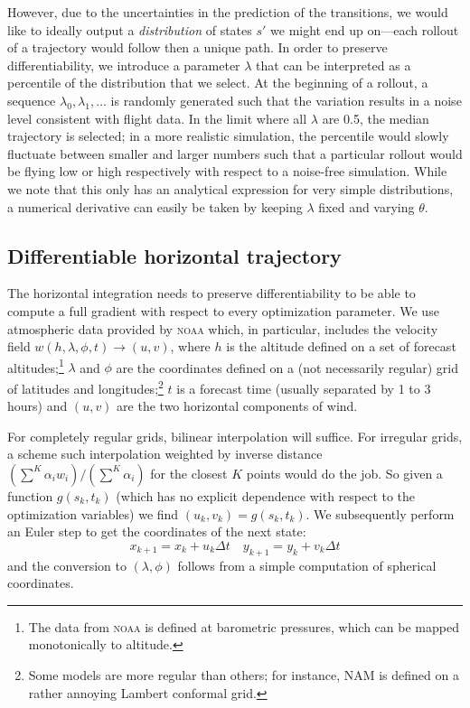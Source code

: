 \documentclass[11pt]{scrartcl} %
\begin{document}
However, due to the uncertainties in the prediction of the transitions, we would like to ideally output a \emph{distribution} of states $s'$ we might end up on---each rollout of a trajectory would follow then a unique path. In order to preserve differentiability, we introduce a parameter $\lambda$ that can be interpreted as a percentile of the distribution that we select. At the beginning of a rollout, a sequence $\lambda_0, \lambda_1, \dots$ is randomly generated such that the variation results in a noise level consistent with flight data. In the limit where all $\lambda$ are 0.5, the median trajectory is selected; in a more realistic simulation, the percentile would slowly fluctuate between smaller and larger numbers such that a particular rollout would be flying low or high respectively with respect to a noise-free simulation. While we note that this only has an analytical expression for very simple distributions, a numerical derivative can easily be taken by keeping $\lambda$ fixed and varying $\theta$.

\subsection{Differentiable horizontal trajectory} \label{sec:horizontal}
The horizontal integration needs to preserve differentiability to be able to compute a full gradient with respect to every optimization parameter. We use atmospheric data provided by \textsc{noaa} which, in particular, includes the velocity field $w(h, \lambda, \phi, t)\to(u, v)$, where $h$ is the altitude defined on a set of forecast altitudes;\footnote{The data from \textsc{noaa} is defined at barometric pressures, which can be mapped monotonically to altitude.} $\lambda$ and $\phi$ are the coordinates defined on a (not necessarily regular) grid of latitudes and longitudes;\footnote{Some models are more regular than others; for instance, NAM is defined on a rather annoying Lambert conformal grid.} $t$ is a forecast time (usually separated by 1 to 3 hours) and $(u, v)$ are the two horizontal components of wind.

For completely regular grids, bilinear interpolation will suffice. For irregular grids, a scheme such interpolation weighted by inverse distance $(\sum^K \alpha_i w_i)/(\sum^K \alpha_i)$ for the closest $K$ points would do the job. So given a function $g(s_k, t_k)$ (which has no explicit dependence with respect to the optimization variables) we find $(u_k, v_k) = g(s_k, t_k)$. We subsequently perform an Euler step to get the coordinates of the next state:
\[x_{k+1} = x_k + u_k\Delta t\quad y_{k+1} = y_k + v_k\Delta t\]
and the conversion to $(\lambda, \phi)$ follows from a simple computation of spherical coordinates.
\end{document}
